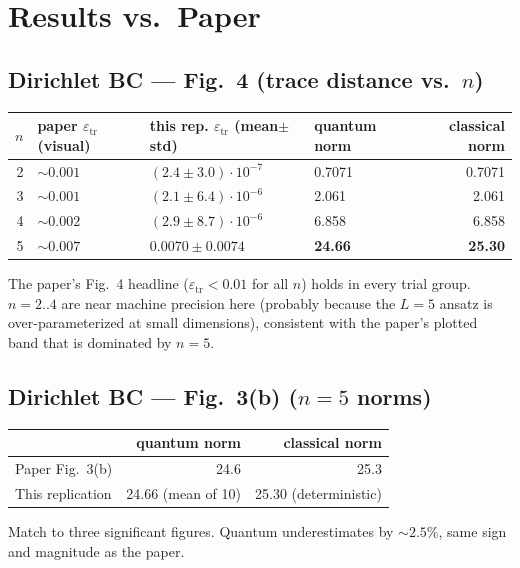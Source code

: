 \documentclass[11pt]{article}
\begin{document}
\section{Results vs.\ Paper}
\subsection{Dirichlet BC --- Fig.~4 (trace distance vs.\ $n$)}
\begin{center}
\begin{tabular}{@{}rlllr@{}}
\toprule
$n$ & paper $\varepsilon_{\text{tr}}$ (visual) & this rep. $\varepsilon_{\text{tr}}$ (mean$\pm$std) & quantum norm & classical norm \\
\midrule
2 & $\sim 0.001$ & $(2.4 \pm 3.0)\cdot 10^{-7}$ & 0.7071 & 0.7071 \\
3 & $\sim 0.001$ & $(2.1 \pm 6.4)\cdot 10^{-6}$ & 2.061  & 2.061 \\
4 & $\sim 0.002$ & $(2.9 \pm 8.7)\cdot 10^{-6}$ & 6.858  & 6.858 \\
5 & $\sim 0.007$ & $\mathbf{0.0070 \pm 0.0074}$ & \textbf{24.66} & \textbf{25.30} \\
\bottomrule
\end{tabular}
\end{center}
The paper's Fig.~4 headline ($\varepsilon_{\text{tr}} < 0.01$ for all $n$) holds in
every trial group. $n=2..4$ are near machine precision here (probably because the
$L=5$ ansatz is over-parameterized at small dimensions), consistent with the paper's
plotted band that is dominated by $n=5$.

\subsection{Dirichlet BC --- Fig.~3(b) ($n=5$ norms)}
\begin{center}
\begin{tabular}{@{}lrr@{}}
\toprule
 & quantum norm & classical norm \\
\midrule
Paper Fig.~3(b)   & 24.6 & 25.3 \\
This replication  & 24.66 (mean of 10) & 25.30 (deterministic) \\
\bottomrule
\end{tabular}
\end{center}
Match to three significant figures. Quantum underestimates by $\sim\!2.5\%$, same
sign and magnitude as the paper.
\end{document}
